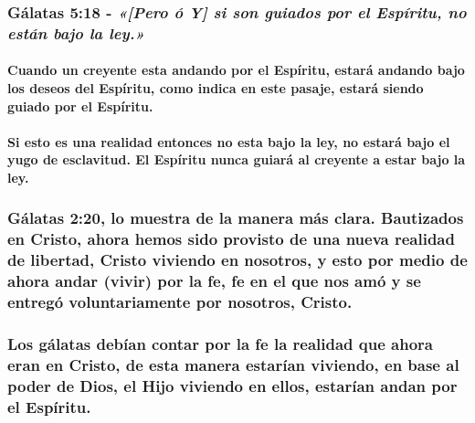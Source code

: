 \documentclass[11a pt,twoside]{article}
\newcommand{\scripture}[1]{%
  {\fontsize{12pt}{16pt}\selectfont\ScriptureFont\itshape #1}%
}
\let\oldsubsubsection\subsubsection
\renewcommand{\subsubsection}{\needspace{4\baselineskip}\oldsubsubsection}
\let\oldparagraph\paragraph
\renewcommand{\paragraph}{\needspace{3\baselineskip}\oldparagraph}
\begin{document}
\subsubsection{\texorpdfstring{Gálatas 5:18 -
\scripture{«[Pero ó Y] si son guiados por el Espíritu, no están bajo la ley.»}}{Gálatas 5:18 - }}\label{guxe1latas-518---pero-uxf3-y-si-son-guiados-por-el-espuxedritu-no-estuxe1n-bajo-la-ley.}

\paragraph{Cuando un creyente esta andando por el Espíritu, estará
andando bajo los deseos del Espíritu, como indica en este pasaje, estará
siendo guiado por el
Espíritu.}\label{cuando-un-creyente-esta-andando-por-el-espuxedritu-estaruxe1-andando-bajo-los-deseos-del-espuxedritu-como-indica-en-este-pasaje-estaruxe1-siendo-guiado-por-el-espuxedritu.}

\paragraph{Si esto es una realidad entonces no esta bajo la ley, no
estará bajo el yugo de esclavitud. El Espíritu nunca guiará al creyente
a estar bajo la
ley.}\label{si-esto-es-una-realidad-entonces-no-esta-bajo-la-ley-no-estaruxe1-bajo-el-yugo-de-esclavitud.-el-espuxedritu-nunca-guiaruxe1-al-creyente-a-estar-bajo-la-ley.}

\subsubsection{Gálatas 2:20, lo muestra de la manera más clara.
Bautizados en Cristo, ahora hemos sido provisto de una nueva realidad de
libertad, Cristo viviendo en nosotros, y esto por medio de ahora andar
(vivir) por la fe, fe en el que nos amó y se entregó voluntariamente por
nosotros,
Cristo.}\label{guxe1latas-220-lo-muestra-de-la-manera-muxe1s-clara.-bautizados-en-cristo-ahora-hemos-sido-provisto-de-una-nueva-realidad-de-libertad-cristo-viviendo-en-nosotros-y-esto-por-medio-de-ahora-andar-vivir-por-la-fe-fe-en-el-que-nos-amuxf3-y-se-entreguxf3-voluntariamente-por-nosotros-cristo.}

\subsubsection{Los gálatas debían contar por la fe la realidad que ahora
eran en Cristo, de esta manera estarían viviendo, en base al poder de
Dios, el Hijo viviendo en ellos, estarían andan por el
Espíritu.}\label{los-guxe1latas-debuxedan-contar-por-la-fe-la-realidad-que-ahora-eran-en-cristo-de-esta-manera-estaruxedan-viviendo-en-base-al-poder-de-dios-el-hijo-viviendo-en-ellos-estaruxedan-andan-por-el-espuxedritu.}
\end{document}
